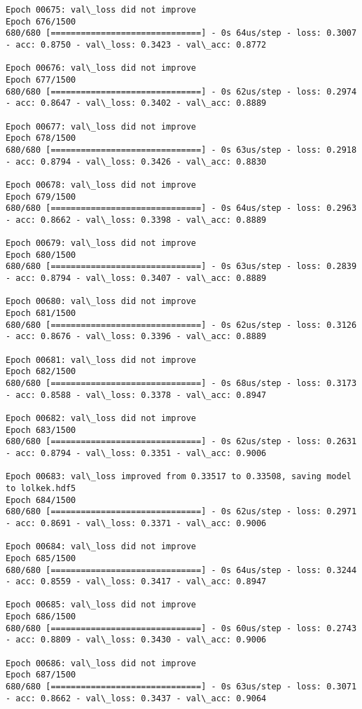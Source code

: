 \documentclass[11pt]{article}
\begin{document}
\begin{Verbatim}[commandchars=\\\{\}]
Epoch 00675: val\_loss did not improve
Epoch 676/1500
680/680 [==============================] - 0s 64us/step - loss: 0.3007 - acc: 0.8750 - val\_loss: 0.3423 - val\_acc: 0.8772

Epoch 00676: val\_loss did not improve
Epoch 677/1500
680/680 [==============================] - 0s 62us/step - loss: 0.2974 - acc: 0.8647 - val\_loss: 0.3402 - val\_acc: 0.8889

Epoch 00677: val\_loss did not improve
Epoch 678/1500
680/680 [==============================] - 0s 63us/step - loss: 0.2918 - acc: 0.8794 - val\_loss: 0.3426 - val\_acc: 0.8830

Epoch 00678: val\_loss did not improve
Epoch 679/1500
680/680 [==============================] - 0s 64us/step - loss: 0.2963 - acc: 0.8662 - val\_loss: 0.3398 - val\_acc: 0.8889

Epoch 00679: val\_loss did not improve
Epoch 680/1500
680/680 [==============================] - 0s 63us/step - loss: 0.2839 - acc: 0.8794 - val\_loss: 0.3407 - val\_acc: 0.8889

Epoch 00680: val\_loss did not improve
Epoch 681/1500
680/680 [==============================] - 0s 62us/step - loss: 0.3126 - acc: 0.8676 - val\_loss: 0.3396 - val\_acc: 0.8889

Epoch 00681: val\_loss did not improve
Epoch 682/1500
680/680 [==============================] - 0s 68us/step - loss: 0.3173 - acc: 0.8588 - val\_loss: 0.3378 - val\_acc: 0.8947

Epoch 00682: val\_loss did not improve
Epoch 683/1500
680/680 [==============================] - 0s 62us/step - loss: 0.2631 - acc: 0.8794 - val\_loss: 0.3351 - val\_acc: 0.9006

Epoch 00683: val\_loss improved from 0.33517 to 0.33508, saving model to lolkek.hdf5
Epoch 684/1500
680/680 [==============================] - 0s 62us/step - loss: 0.2971 - acc: 0.8691 - val\_loss: 0.3371 - val\_acc: 0.9006

Epoch 00684: val\_loss did not improve
Epoch 685/1500
680/680 [==============================] - 0s 64us/step - loss: 0.3244 - acc: 0.8559 - val\_loss: 0.3417 - val\_acc: 0.8947

Epoch 00685: val\_loss did not improve
Epoch 686/1500
680/680 [==============================] - 0s 60us/step - loss: 0.2743 - acc: 0.8809 - val\_loss: 0.3430 - val\_acc: 0.9006

Epoch 00686: val\_loss did not improve
Epoch 687/1500
680/680 [==============================] - 0s 63us/step - loss: 0.3071 - acc: 0.8662 - val\_loss: 0.3437 - val\_acc: 0.9064


\end{Verbatim}
\end{document}
